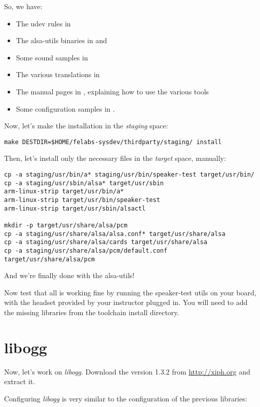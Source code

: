So, we have:
\begin{itemize}
\item The udev rules in 
\item The alsa-utils binaries in  and 
\item Some sound samples in 
\item The various translations in 
\item The manual pages in , explaining how to
  use the various tools
\item Some configuration samples in .
\end{itemize}

Now, let's make the installation in the {\em staging} space:

\begin{verbatim}
make DESTDIR=$HOME/felabs-sysdev/thirdparty/staging/ install
\end{verbatim}

Then, let's install only the necessary files in the {\em target}
space, manually:

\begin{verbatim}
cp -a staging/usr/bin/a* staging/usr/bin/speaker-test target/usr/bin/
cp -a staging/usr/sbin/alsa* target/usr/sbin
arm-linux-strip target/usr/bin/a*
arm-linux-strip target/usr/bin/speaker-test
arm-linux-strip target/usr/sbin/alsactl

mkdir -p target/usr/share/alsa/pcm
cp -a staging/usr/share/alsa/alsa.conf* target/usr/share/alsa
cp -a staging/usr/share/alsa/cards target/usr/share/alsa
cp -a staging/usr/share/alsa/pcm/default.conf target/usr/share/alsa/pcm
\end{verbatim}

And we're finally done with the alsa-utils!

Now test that all is working fine by running the speaker-test utils on
your board, with the headset provided by your instructor plugged
in. You will need to add the missing libraries from the toolchain
install directory.

\section{libogg}

Now, let's work on {\em libogg}. Download the version 1.3.2 from
\url{http://xiph.org} and extract it.

Configuring {\em libogg} is very similar to the configuration of the
previous libraries:

